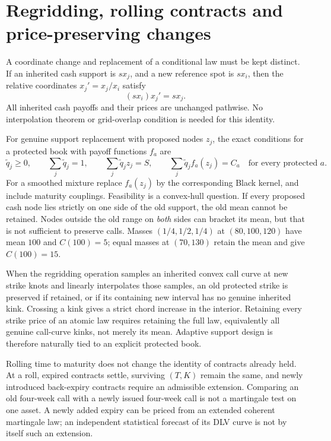 \documentclass[11pt,a4paper]{article}
\numberwithin{equation}{section}
\theoremstyle{definition}\newtheorem{definition}[theorem]{Definition}
\theoremstyle{remark}\newtheorem{remark}[theorem]{Remark}
\begin{document}
\section{Regridding, rolling contracts and price-preserving changes}
\label{sec:regrid}
A coordinate change and replacement of a conditional law must be kept distinct. If an inherited cash support is $s x_j$, and a new reference spot is $s x_i$, then the relative coordinates $x_j'=x_j/x_i$ satisfy
\[
 (s x_i)x_j'=s x_j.
\]
All inherited cash payoffs and their prices are unchanged pathwise. No interpolation theorem or grid-overlap condition is needed for this identity.

For genuine support replacement with proposed nodes $z_j$, the exact conditions for a protected book with payoff functions $f_a$ are
\begin{equation}
 \widetilde q_j\geq0,\qquad
 \sum_j\widetilde q_j=1,\qquad
 \sum_j\widetilde q_jz_j=S,\qquad
 \sum_j\widetilde q_jf_a(z_j)=C_a\quad\text{for every protected }a.
 \label{eq:regrid-lp}
\end{equation}
For a smoothed mixture replace $f_a(z_j)$ by the corresponding Black kernel, and include maturity couplings. Feasibility is a convex-hull question. If every proposed cash node lies strictly on one side of the old support, the old mean cannot be retained. Nodes outside the old range on \emph{both} sides can bracket its mean, but that is not sufficient to preserve calls. Masses $(1/4,1/2,1/4)$ at $(80,100,120)$ have mean $100$ and $C(100)=5$; equal masses at $(70,130)$ retain the mean and give $C(100)=15$.

When the regridding operation samples an inherited convex call curve at new strike knots and linearly interpolates those samples, an old protected strike is preserved if retained, or if its containing new interval has no genuine inherited kink. Crossing a kink gives a strict chord increase in the interior. Retaining every strike price of an atomic law requires retaining the full law, equivalently all genuine call-curve kinks, not merely its mean. Adaptive support design is therefore naturally tied to an explicit protected book.

Rolling time to maturity does not change the identity of contracts already held. At a roll, expired contracts settle, surviving $(T,K)$ remain the same, and newly introduced back-expiry contracts require an admissible extension. Comparing an old four-week call with a newly issued four-week call is not a martingale test on one asset. A newly added expiry can be priced from an extended coherent martingale law; an independent statistical forecast of its DLV curve is not by itself such an extension.
\end{document}
